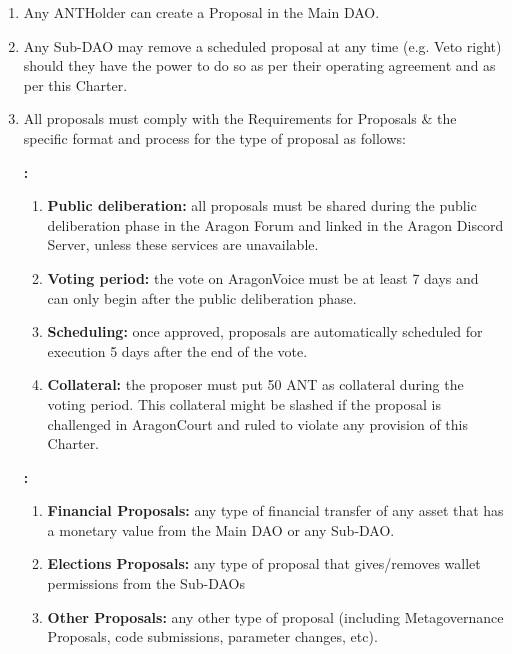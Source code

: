 \begin{enumerate}
\begin{enumerate}
	\end{enumerate}

	\begin{enumerate}
		
		\item Any \ac{ANTHolder} can create a Proposal in the Main \ac{DAO}.
		\item Any Sub-\ac{DAO} may remove a scheduled proposal at any time (e.g. Veto right) should they have the power to do so as per their operating agreement and as per this Charter.
		\item All proposals must comply with the Requirements for Proposals \& the specific format and process for the type of proposal as follows:
		
		\textbf{:}
		\begin{enumerate}
			\item \textbf{Public deliberation:} all proposals must be shared during the public deliberation phase in the Aragon Forum and linked in the Aragon Discord Server, unless these services are unavailable.
			\item \textbf{Voting period:} the vote on \gls{AragonVoice} must be at least 7 days and can only begin after the public deliberation phase.
			\item \textbf{Scheduling:} once approved, proposals are automatically scheduled for execution 5 days after the end of the vote.
			\item \textbf{Collateral:} the proposer must put 50 \ac{ANT} as collateral during the voting period.
			This collateral might be slashed if the proposal is challenged in \gls{AragonCourt} and ruled to violate any provision of this Charter.
		\end{enumerate}
	
		\textbf{:}
		\begin{enumerate}		
			\item \textbf{Financial Proposals:} any type of financial transfer of any asset that has a monetary value from the Main \ac{DAO} or any Sub-\ac{DAO}.
			\item \textbf{Elections Proposals:} any type of proposal that gives/removes wallet permissions from the Sub-\acp{DAO}
			\item \textbf{Other Proposals:} any other type of proposal (including Metagovernance Proposals, code submissions, parameter changes, etc).
		\end{enumerate}


\end{enumerate}
\end{enumerate}
